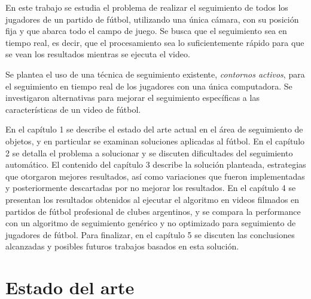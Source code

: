 \documentclass[a4paper,11pt]{report}
\begin{document}
En este trabajo se estudia el problema de realizar el seguimiento de todos los
jugadores de un partido de fútbol, utilizando una única cámara, con su posición
fija y que abarca todo el campo de juego. Se busca que el seguimiento sea en
tiempo real, es decir, que el procesamiento sea lo suficientemente rápido para
que se vean los resultados mientras se ejecuta el video.

Se plantea el uso de una técnica de seguimiento existente, \textit{contornos
activos}, para el seguimiento en tiempo real de los jugadores con una única
computadora. Se investigaron alternativas para mejorar el seguimiento
específicas a las características de un video de fútbol.

En el capítulo 1 se describe el estado del arte actual en el área de
seguimiento de objetos, y en particular se examinan soluciones aplicadas al
fútbol. En el capítulo 2 se detalla el problema a solucionar y se discuten
dificultades del seguimiento automático. El contenido del capítulo 3 describe
la solución planteada, estrategias que otorgaron mejores resultados, así como
variaciones que fueron implementadas y posteriormente descartadas por no
mejorar los resultados. En el capítulo 4 se presentan los resultados obtenidos
al ejecutar el algoritmo en videos filmados en partidos de fútbol profesional
de clubes argentinos, y se compara la performance con un algoritmo de
seguimiento genérico y no optimizado para seguimiento de jugadores de fútbol.
Para finalizar, en el capítulo 5 se discuten las conclusiones alcanzadas y
posibles futuros trabajos basados en esta solución.

\newpage

\chapter{Estado del arte}



\newpage













\printbibliography
\end{document}
